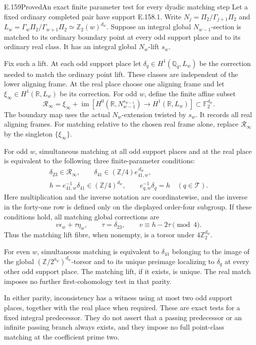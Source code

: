 \begin{result}{E.159}{Proved}{An exact finite parameter test for every dyadic matching step}
Let a fixed ordinary completed pair have support E.158.1.
Write \(N_j=\Pi_2/\Gamma_{j+1}\Pi_2\) and
\(L_w=\Gamma_w\Pi_2/\Gamma_{w+1}\Pi_2
\simeq\mathbb Z_2(w)^{d_w}\).
Suppose an integral global \(N_{w-1}\)-section is matched
to its ordinary boundary point at every odd support
place and to its ordinary real class.
It has an integral global \(N_w\)-lift \(s_w\).

Fix such a lift. At each odd support place let
\(\delta_q\in H^1(\mathbb Q_q,L_w)\) be the correction
needed to match the ordinary point lift. These classes
are independent of the lower aligning frame. At the
real place choose one aligning frame and let
\(\xi_\infty\in H^1(\mathbb R,L_w)\) be its correction.
For odd \(w\), define the finite affine subset
\[
 \mathcal R_\infty=\xi_\infty+
 \operatorname{im}\left[
 H^0(\mathbb R,N_{w-1}^{s_{w-1}})
       \longrightarrow H^1(\mathbb R,L_w)\right]
 \subset\mathbb F_2^{d_w}.
 \tag{E.159.1}
\]
The boundary map uses the actual \(N_w\)-extension
twisted by \(s_w\). It records all real aligning frames.
For matching relative to the chosen real frame alone,
replace \(\mathcal R_\infty\) by the singleton
\(\{\xi_\infty\}\).

For odd \(w\), simultaneous matching at all odd support
places and at the real place is equivalent to the
following three finite-parameter conditions:
\[
\begin{gathered}
 \delta_{23}\in\mathcal R_\infty,\qquad
 \delta_{41}\in
       (\mathbb Z/4)e_{41,w}^{\,d_w},\\
 h=e_{41,w}^{-1}\delta_{41}\in(\mathbb Z/4)^{d_w},
 \qquad
 e_{q,w}^{-1}\delta_q=h
                       \quad(q\in\mathcal T).
\end{gathered}
\tag{E.159.2}
\]
Here multiplication and the inverse notation are coordinatewise,
and the inverse in the forty-one row is defined only on the
displayed order-four subgroup. If these conditions hold, all
matching global corrections are
\[
 v\epsilon_w+\tau\eta_w,\qquad
 \tau=\delta_{23},\qquad
 v\equiv h-2\tau\pmod4.
 \tag{E.159.3}
\]
Thus the matching lift fibre, when nonempty, is a torsor
under \(4\mathbb Z_2^{d_w}\).

For even \(w\), simultaneous matching is equivalent to
\(\delta_{41}\) belonging to the image of the global
\((\mathbb Z/2^{a_w})^{d_w}\)-torsor and to its unique
preimage localizing to \(\delta_q\) at every other odd
support place. The matching lift, if it exists, is unique.
The real match imposes no further first-cohomology test
in that parity.

In either parity, inconsistency has a witness using at
most two odd support places, together with the real
place when required. These are exact tests for a fixed
integral predecessor. They do not assert that a passing
predecessor or an infinite passing branch always exists,
and they impose no full point-class matching at the
coefficient prime two.
\end{result}
